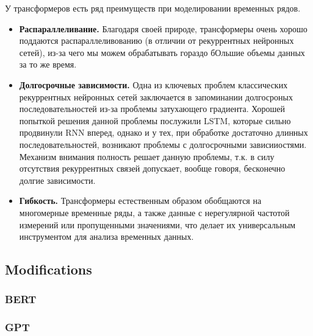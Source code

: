 У трансформеров есть ряд преимуществ при моделировании временных рядов.
\begin{itemize}
    \item \textbf{Распараллеливание.} Благодаря своей природе, трансформеры очень хорошо 
    поддаются распараллеливованию (в отличии от рекуррентных нейронных сетей), из-за 
    чего мы можем обрабатывать гораздо бОльшие объемы данных за то же время.
    \item \textbf{Долгосрочные зависимости.} Одна из ключевых проблем классических 
    рекуррентных нейронных сетей заключается в запоминании долгосроных последовательностей 
    из-за проблемы затухающего градиента. Хорошей попыткой решения данной проблемы 
    послужили LSTM, которые сильно продвинули RNN вперед, однако и у тех, при обработке 
    достаточно длинных последовательностей, возникают проблемы с долгосрочными зависииостями. 
    Механизм внимания полность решает данную проблемы, т.к. в силу отсутствия рекуррентных 
    связей допускает, вообще говоря, бесконечно долгие зависимости.
    \item \textbf{Гибкость.} Трансформеры естественным образом обобщаются на многомерные 
    временные ряды, а также данные с нерегулярной частотой измерений или пропущенными значениями, 
    что делает их универсальным инструментом для анализа временных данных.
\end{itemize}

\subsection{\color{red}Modifications}


\subsubsection{\color{red}BERT}


\subsubsection{\color{red}GPT}
